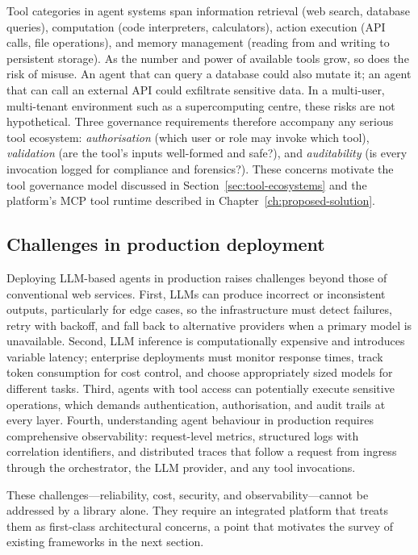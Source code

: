 \documentclass[a4paper,noexaminfo]{sapthesis}
\begin{document}
Tool categories in agent systems span information retrieval (web search,
database queries), computation (code interpreters, calculators), action
execution (API calls, file operations), and memory management (reading
from and writing to persistent storage).  As the number and power of
available tools grow, so does the risk of misuse.  An agent that can query
a database could also mutate it; an agent that can call an external API
could exfiltrate sensitive data.  In a multi-user, multi-tenant environment
such as a supercomputing centre, these risks are not hypothetical.  Three
governance requirements therefore accompany any serious tool ecosystem:
\emph{authorisation} (which user or role may invoke which tool),
\emph{validation} (are the tool's inputs well-formed and safe?), and
\emph{auditability} (is every invocation logged for compliance and
forensics?).  These concerns motivate the tool governance model discussed
in Section~\ref{sec:tool-ecosystems} and the platform's MCP tool runtime
described in Chapter~\ref{ch:proposed-solution}.

\subsection{Challenges in production deployment}

Deploying LLM-based agents in production raises challenges beyond those of
conventional web services.  First, LLMs can produce incorrect or
inconsistent outputs, particularly for edge cases, so the infrastructure
must detect failures, retry with backoff, and fall back to alternative
providers when a primary model is unavailable.  Second, LLM inference is
computationally expensive and introduces variable latency; enterprise
deployments must monitor response times, track token consumption for cost
control, and choose appropriately sized models for different tasks.  Third,
agents with tool access can potentially execute sensitive operations, which
demands authentication, authorisation, and audit trails at every layer.
Fourth, understanding agent behaviour in production requires comprehensive
observability: request-level metrics, structured logs with correlation
identifiers, and distributed traces that follow a request from ingress
through the orchestrator, the LLM provider, and any tool invocations.

These challenges---reliability, cost, security, and
observability---cannot be addressed by a library alone.  They require an
integrated platform that treats them as first-class architectural concerns,
a point that motivates the survey of existing frameworks in the next
section.
\end{document}

